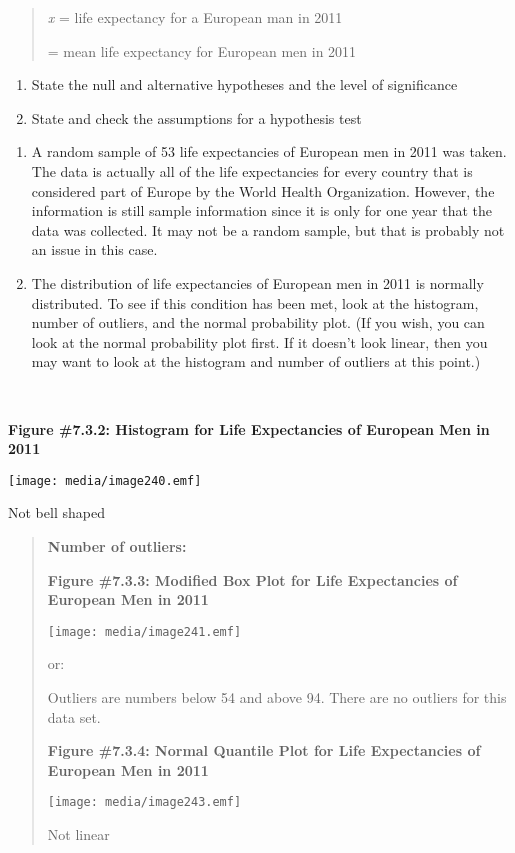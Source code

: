 \documentclass[]{book}
\begin{document}
\begin{quote}
\emph{x} = life expectancy for a European man in 2011

= mean life expectancy for European men in 2011
\end{quote}

\begin{enumerate}
\def\labelenumi{\arabic{enumi}.}
\setcounter{enumi}{1}
\item
  State the null and alternative hypotheses and the level of
  significance
\item
  State and check the assumptions for a hypothesis test
\end{enumerate}

\begin{enumerate}
\def\labelenumi{\alph{enumi}.}
\item
  A random sample of 53 life expectancies of European men in 2011 was
  taken. The data is actually all of the life expectancies for every
  country that is considered part of Europe by the World Health
  Organization. However, the information is still sample information
  since it is only for one year that the data was collected. It may
  not be a random sample, but that is probably not an issue in this
  case.
\item
  The distribution of life expectancies of European men in 2011 is
  normally distributed. To see if this condition has been met, look at
  the histogram, number of outliers, and the normal probability plot.
  (If you wish, you can look at the normal probability plot first. If
  it doesn't look linear, then you may want to look at the histogram
  and number of outliers at this point.)
\end{enumerate}

\textbf{\\
}

\textbf{Figure \#7.3.2: Histogram for Life Expectancies of European Men in
2011}

\texttt{[image: media/image240.emf]}

Not bell shaped

\begin{quote}
\textbf{Number of outliers:}

\textbf{Figure \#7.3.3: Modified Box Plot for Life Expectancies of European
Men in 2011}

\texttt{[image: media/image241.emf]}

or:

Outliers are numbers below 54 and above 94. There are no outliers for
this data set.

\textbf{Figure \#7.3.4: Normal Quantile Plot for Life Expectancies of
European Men in 2011}

\texttt{[image: media/image243.emf]}

Not linear
\end{quote}
\end{document}
